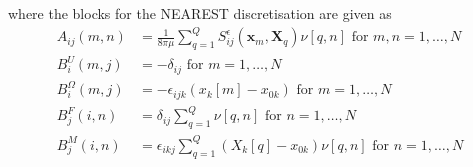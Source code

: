 where the blocks for the NEAREST discretisation are given as
\begin{equation*}
\begin{aligned}
A_{ij}(m,n) &= \frac{1}{8\pi\mu} \sum_{q=1}^Q S_{ij}^\epsilon (\bm{x}_m,\bm{X}_{q})\nu[q,n] \text { for } m,n = 1,\dots,N \\
B_{i}^{U}(m,j) &= -\delta_{ij} \text { for } m = 1,\dots,N \\
B_{i}^{\Omega}(m,j) &= -\epsilon_{ijk}(x_k[m]-x_{0k}) \text { for } m = 1,\dots,N \\
B_{j}^{F}(i,n) &= \delta_{ij} \sum_{q=1}^Q \nu[q,n] \text { for } n = 1,\dots,N \\
B_{j}^{M}(i,n) &= \epsilon_{ikj} \sum_{q=1}^Q (X_k[q]-x_{0 k}) \nu[q,n] \text { for } n = 1,\dots,N
\end{aligned}
\end{equation*}


